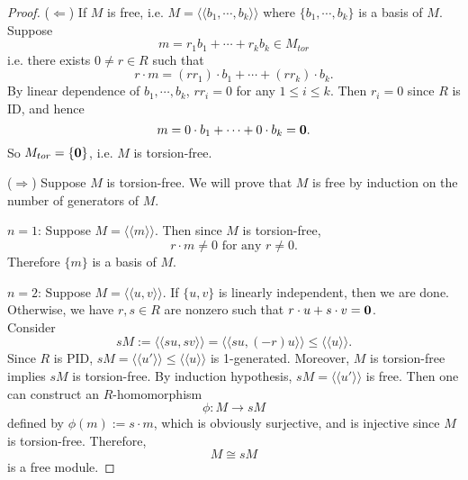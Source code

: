 \documentclass[12pt]{amsbook}
\begin{document}
\begin{proof}
    ($\Leftarrow$) If $M$ is free, i.e. $M=\langle\langle b_1,\cdots,b_k\rangle\rangle$
    where $\{b_1,\cdots,b_k\}$ is a basis of $M$. Suppose 
    $$m=r_1b_1+\cdots+r_kb_k\in M_{tor}$$
    i.e. there exists $0\neq r\in R$ such that
    $$r\cdot m=(rr_1)\cdot b_1+\cdots+(rr_k)\cdot b_k.$$
    By linear dependence of $b_1,\cdots,b_k$, $rr_i=0$ for any $1\leq i\leq k$. Then $r_i=0$ since $R$ is ID, and hence
    $$m=0\cdot b_1+\cdots+0\cdot b_k={\bf 0}.$$
    So $M_{tor}=\{{\bf 0}\}$, i.e. $M$ is torsion-free.

    ($\Rightarrow$) Suppose $M$ is torsion-free. We  will prove that $M$ is free by induction on the number of generators of $M$.

    $n=1$: Suppose $M=\langle\langle m\rangle\rangle$. Then since $M$ is torsion-free,
    $$r\cdot m\neq0\text{ for any }r\neq0.$$
    Therefore $\{m\}$ is a basis of $M$.

    $n=2$: Suppose $M=\langle\langle u,v\rangle\rangle$. If $\{u,v\}$ is linearly independent, then we are done. Otherwise, we have $r,s\in R$ are nonzero such that $r\cdot u+s\cdot v={\bf 0}$.\\
    Consider
    $$sM:=\langle\langle su,sv\rangle\rangle=\langle\langle su,(-r)u\rangle\rangle\leq\langle\langle u\rangle\rangle.$$
    Since $R$ is PID, $sM=\langle\langle u'\rangle\rangle\leq\langle\langle u\rangle\rangle$ is 1-generated. Moreover, $M$ is torsion-free implies $sM$ is torsion-free. By induction hypothesis, $sM=\langle\langle u'\rangle\rangle$ is free. Then one can construct an $R$-homomorphism
    $$\phi: M \to sM$$
    defined by $\phi(m) := s\cdot m$, which is obviously surjective, and is injective since $M$ is torsion-free. Therefore,
    $$M \cong sM$$
    is a free module. 


\end{proof}
\end{document}
